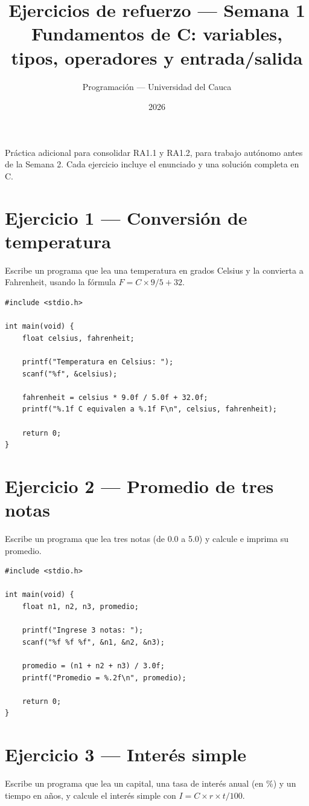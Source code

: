 \documentclass[11pt,letterpaper]{article}
\title{\textcolor{unicaucaverde}{Ejercicios de refuerzo --- Semana 1}\\[4pt]
  \large Fundamentos de C: variables, tipos, operadores y entrada/salida}
\author{Programación --- Universidad del Cauca}
\date{2026}
\begin{document}
\maketitle

Práctica adicional para consolidar RA1.1 y RA1.2, para trabajo autónomo antes de la Semana 2. Cada
ejercicio incluye el enunciado y una solución completa en C.

\section*{Ejercicio 1 --- Conversión de temperatura}
Escribe un programa que lea una temperatura en grados Celsius y la convierta a Fahrenheit, usando
la fórmula $F = C \times 9/5 + 32$.

\begin{lstlisting}
#include <stdio.h>

int main(void) {
    float celsius, fahrenheit;

    printf("Temperatura en Celsius: ");
    scanf("%f", &celsius);

    fahrenheit = celsius * 9.0f / 5.0f + 32.0f;
    printf("%.1f C equivalen a %.1f F\n", celsius, fahrenheit);

    return 0;
}
\end{lstlisting}

\section*{Ejercicio 2 --- Promedio de tres notas}
Escribe un programa que lea tres notas (de 0.0 a 5.0) y calcule e imprima su promedio.

\begin{lstlisting}
#include <stdio.h>

int main(void) {
    float n1, n2, n3, promedio;

    printf("Ingrese 3 notas: ");
    scanf("%f %f %f", &n1, &n2, &n3);

    promedio = (n1 + n2 + n3) / 3.0f;
    printf("Promedio = %.2f\n", promedio);

    return 0;
}
\end{lstlisting}

\section*{Ejercicio 3 --- Interés simple}
Escribe un programa que lea un capital, una tasa de interés anual (en \%) y un tiempo en años, y
calcule el interés simple con $I = C \times r \times t / 100$.
\end{document}
